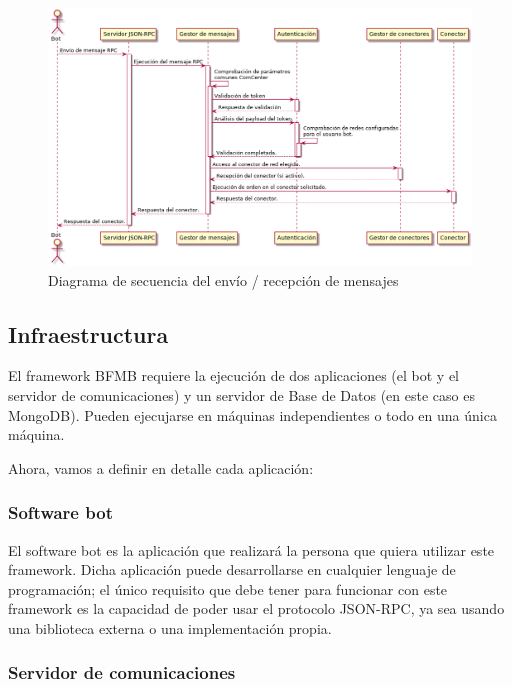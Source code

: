 \documentclass[spanish,12pt, a4paper, twoside]{paper}
\begin{document}
\begin{figure}
\centering
	\includegraphics[width=\textwidth]{recursos/sequence}
\caption{Diagrama de secuencia del envío / recepción de mensajes}
\label{fig:DSecuencia envío recepción órdenes}
\end{figure}

\subsection{Infraestructura}

El framework BFMB requiere la ejecución de dos aplicaciones (el bot y el servidor de comunicaciones) y un servidor de Base de Datos (en este caso es MongoDB). Pueden ejecujarse en máquinas independientes o todo en una única máquina.
\newline

Ahora, vamos a definir en detalle cada aplicación:

\subsubsection{Software bot}

El software bot es la aplicación que realizará la persona que quiera utilizar este framework. Dicha aplicación puede desarrollarse en cualquier lenguaje de programación; el único requisito que debe tener para funcionar con este framework es la capacidad de poder usar el protocolo JSON-RPC, ya sea usando una biblioteca externa o una implementación propia.

\subsubsection{Servidor de comunicaciones}
\end{document}
